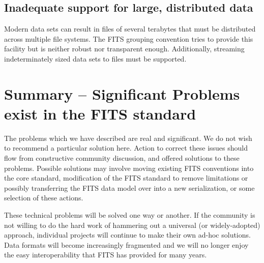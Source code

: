 \documentclass[11pt,twoside]{article}
\begin{document}
\subsection{Inadequate support for large, distributed data}

Modern data sets can result in files of several terabytes that must be
distributed across multiple file systems. The FITS grouping convention
tries to provide this facility but is neither robust nor transparent
enough. Additionally, streaming indeterminately sized data sets
to files must be supported.


\section{Summary -- Significant Problems exist in the FITS standard}

The problems which we have described are real and significant. We
do not wish to recommend a particular solution here. Action to correct
these issues should flow from constructive community discussion, and
offered solutions to these problems. Possible solutions may involve
moving existing FITS conventions into the core standard,
modification of the FITS standard to remove limitations or possibly
transferring the FITS data model over into a new serialization, or
some selection of these actions.

These technical problems will be solved one way or another. If the
community is not willing to do the hard work of hammering out a
universal (or widely-adopted) approach, individual projects will
continue to make their own ad-hoc solutions. Data formats will become
increasingly fragmented and we will no longer enjoy the easy
interoperability that FITS has provided for many years.



\end{document}
